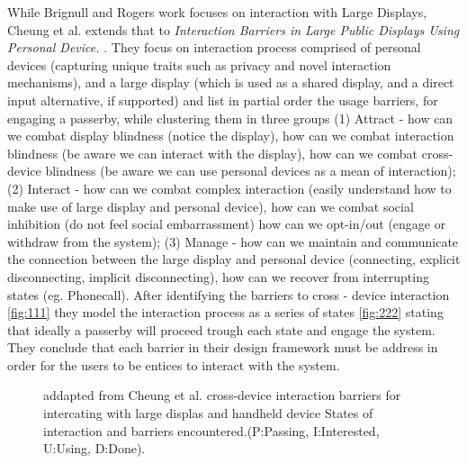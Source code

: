 While Brignull and Rogers work focuses on interaction with Large Displays, Cheung et al.  extends that to \emph{Interaction Barriers in Large Public Displays Using Personal Device.} \cite{Cheung:2014}. They focus on interaction process comprised of personal devices (capturing unique traits such as privacy and novel interaction mechanisms), and a large display (which is used as a shared display, and a direct input alternative, if supported) and list in partial order the usage barriers, for engaging a passerby, while clustering them in three groups (1) Attract - how can we combat display blindness (notice the display), how can we combat interaction blindness (be aware we can interact with the display), how can we combat cross-device blindness (be aware we can use personal devices as a mean of interaction); (2) Interact - how can we combat complex interaction (easily understand how to make use of large display and personal device), how can we combat social inhibition (do not feel social embarrassment) how can we opt-in/out (engage or withdraw from the system); (3) Manage - how can we maintain and communicate the connection between the large display and personal device (connecting, explicit disconnecting, implicit disconnecting), how can we recover from interrupting states (eg. Phonecall). After identifying the barriers to cross - device interaction \ref{fig:111} they model the interaction process as a series of states \ref{fig:222} stating that ideally a passerby will proceed trough each state and engage the system. They conclude that each barrier in their design framework must be address in order for the users to be entices to interact with the system.

\begin{figure}[H]
	\centering
	\caption{
		addapted from Cheung et al.
		\protect{} cross-device interaction barriers for intercating with large displas and handheld device
		\protect{} States  of interaction and barriers encountered.(P:Passing, I:Interested, U:Using, D:Done).
		}
	\label{fig:Cheung et al. ideas}
\end{figure}
